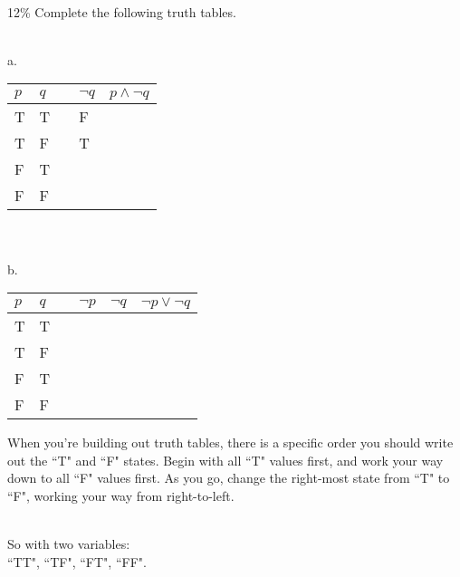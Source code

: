 \documentclass[a4paper,12pt]{book}
\begin{document}
        ~\\
        \begin{question}{4}{12\%}
            Complete the following truth tables. ~\\
        \end{question}

        ~\\
        a.
        \begin{tabular}{ | p{1cm} | p{1cm} | c | p{2cm} | p{3cm} | }
            \hline
            $p$ & $q$ & & $\neg q$ & $p \land \neg q$ \\ \hline
            T & T & & F & \\ \hline
            T & F & & T & \\ \hline
            F & T & &  & \\ \hline
            F & F & &  & \\ \hline
        \end{tabular}

        ~\\~\\
        b.
        \begin{tabular}{ | p{1cm} | p{1cm} | c | p{2cm} | p{2cm} | p{3cm} | }
            \hline
            $p$ & $q$ & & $\neg p$ & $\neg q$ & $\neg p \lor \neg q$ \\ \hline
            T & T & & & & \\ \hline
            T & F & & & & \\ \hline
            F & T & & & & \\ \hline
            F & F & & & & \\ \hline
        \end{tabular}

        \newpage
        \begin{introNOHEAD}
            When you're building out truth tables, there is a specific order
            you should write out the ``T" and ``F" states.
            Begin with all ``T" values first, and work your way down to
            all ``F" values first. As you go, change the right-most state
            from ``T" to ``F", working your way from right-to-left.

            ~\\
            So with two variables: \\ ``TT", ``TF", ``FT", ``FF".
        \end{introNOHEAD}
\end{document}
